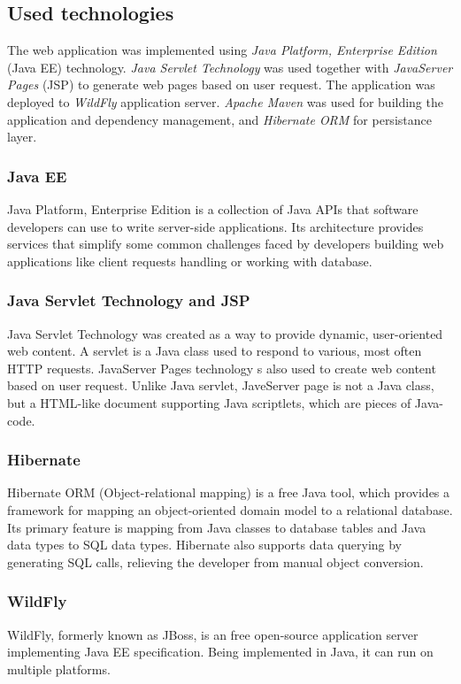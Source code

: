 \documentclass[thesis=B,english]{FITthesis}[2012/06/26]
\begin{document}
	\subsection{Used technologies}
	The web application was implemented using \emph{Java Platform, Enterprise Edition} (Java EE) technology. \emph{Java Servlet Technology} was used together with \emph{JavaServer Pages} (JSP) to generate web pages based on user request. The application was deployed to \emph{WildFly} application server. \emph{Apache Maven} was used for building the application and dependency management, and \emph{Hibernate ORM} for persistance layer.
	\subsubsection{Java EE}
	Java Platform, Enterprise Edition is a collection of Java APIs that software developers can use to write server-side applications. Its architecture provides services that simplify some common challenges faced by developers building web applications like client requests handling or working with database.
	\subsubsection{Java Servlet Technology and JSP}
	Java Servlet Technology was created as a way to provide dynamic, user-oriented web content. A servlet is a Java class used to respond to various, most often HTTP requests. JavaServer Pages technology s also used to create web content based on user request. Unlike Java servlet, JaveServer page is not a Java class, but a HTML-like document supporting Java scriptlets, which are pieces of Java-code.
	\subsubsection{Hibernate}
	Hibernate ORM (Object-relational mapping) is a free Java tool, which provides a framework for mapping an object-oriented domain model to a relational database. Its primary feature is mapping from Java classes to database tables and Java data types to SQL data types. Hibernate also supports data querying by generating SQL calls, relieving the developer from manual object conversion.
	\subsubsection{WildFly}
	WildFly, formerly known as JBoss, is an free open-source application server implementing Java EE specification. Being implemented in Java, it can run on multiple platforms.
\end{document}
